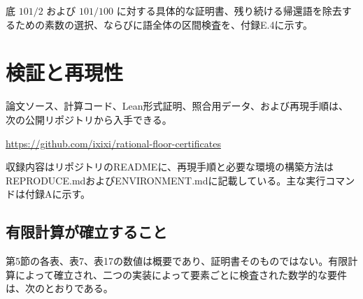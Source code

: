 \documentclass[11pt,reqno]{amsart}
\theoremstyle{definition}
\theoremstyle{definition}
\theoremstyle{remark}
\begin{document}
底 \(101/2\) および \(101/100\) に対する具体的な証明書、残り続ける帰還語を除去するための素数の選択、ならびに語全体の区間検査を、付録E.4に示す。

\section{検証と再現性}\label{sec:9}

論文ソース、計算コード、Lean形式証明、照合用データ、および再現手順は、次の公開リポジトリから入手できる。

\url{https://github.com/ixixi/rational-floor-certificates}

収録内容はリポジトリのREADMEに、再現手順と必要な環境の構築方法はREPRODUCE.mdおよびENVIRONMENT.mdに記載している。主な実行コマンドは付録Aに示す。

\subsection{有限計算が確立すること}\label{sec:9.1}

第5節の各表、表7、表17の数値は概要であり、証明書そのものではない。有限計算によって確立され、二つの実装によって要素ごとに検査された数学的な要件は、次のとおりである。
\end{document}
